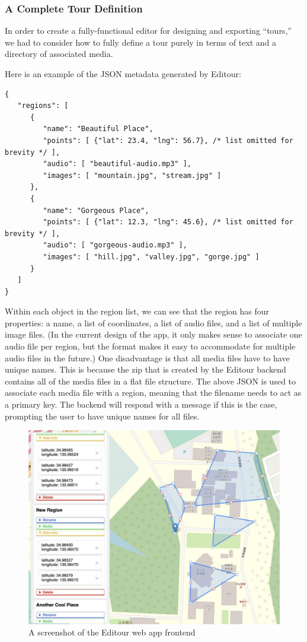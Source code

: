 \documentclass[a4paper, 10pt, american, titlepage]{article}
\begin{document}
\subsubsection{A Complete Tour Definition}
\label{sec:tourDefinition}

In order to create a fully-functional editor for designing and exporting
``tours,'' we had to consider how to fully define a tour purely in terms
of text and a directory of associated media.

Here is an example of the JSON metadata generated by Editour:

\begin{verbatim}
{
   "regions": [
      {
         "name": "Beautiful Place",
         "points": [ {"lat": 23.4, "lng": 56.7}, /* list omitted for brevity */ ],
         "audio": [ "beautiful-audio.mp3" ],
         "images": [ "mountain.jpg", "stream.jpg" ]
      },
      {
         "name": "Gorgeous Place",
         "points": [ {"lat": 12.3, "lng": 45.6}, /* list omitted for brevity */ ],
         "audio": [ "gorgeous-audio.mp3" ],
         "images": [ "hill.jpg", "valley.jpg", "gorge.jpg" ]
      }
   ]
}
\end{verbatim}

Within each object in the region list, we can see that the region has four
properties: a name, a list of coordinates, a list of audio files, and a list of
multiple image files. (In the current design of the app, it only makes sense to
associate one audio file per region, but the format makes it easy to
accommodate for multiple audio files in the future.) One disadvantage is that
all media files have to have unique names. This is because the zip that is
created by the Editour backend contains all of the media files in a flat file
structure. The above JSON is used to associate each media file with a region,
meaning that the filename needs to act as a primary key. The backend will
respond with a message if this is the case, prompting the user to have unique
names for all files.

\begin{figure}[h]
	\centering
	\includegraphics[width=\textwidth]{editour.jpg}
	\caption{A screenshot of the Editour web app frontend}
	\label{fig:editour}
\end{figure}
\end{document}
